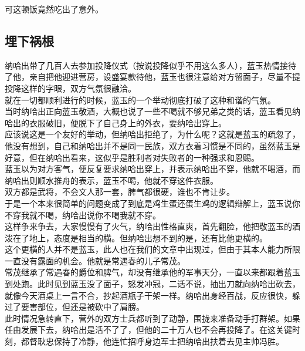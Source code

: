 \begin{multicols}{\theparacolNo}
可这顿饭竟然吃出了意外。\\

\subsection{埋下祸根}
纳哈出带了几百人去参加投降仪式（按说投降似乎不用这么多人），蓝玉热情接待了他，亲自把他迎进营房，设盛宴款待他，蓝玉也很注意给对方留面子，尽量不提投降这样的字眼，双方气氛很融洽。\\

就在一切都顺利进行的时候，蓝玉的一个举动彻底打破了这种和谐的气氛。\\

当时纳哈出正向蓝玉敬酒，大概也说了一些不喝就不够兄弟之类的话，蓝玉看见纳哈出的衣服破旧，便脱下了自己身上的外衣，要纳哈出穿上。\\

应该说这是一个友好的举动，但纳哈出拒绝了，为什么呢？这就是蓝玉的疏忽了，他没有想到，自己和纳哈出并不是同一民族，双方衣着习惯是不同的，虽然蓝玉是好意，但在纳哈出看来，这似乎是胜利者对失败者的一种强求和恩赐。\\

蓝玉以为对方客气，便反复要求纳哈出穿上，并表示纳哈出不穿，他就不喝酒，而纳哈出则顺水推舟的表示，蓝玉不喝，他就不穿这件衣服。\\

双方都是武将，不会文人那一套，脾气都很硬，谁也不肯让步。\\

于是一个本来很简单的问题变成了到底是鸡生蛋还蛋生鸡的逻辑辩解上，蓝玉说你不穿我就不喝，纳哈出说你不喝我就不穿。\\

这样争来争去，大家慢慢有了火气，纳哈出性格直爽，首先翻脸，他把敬蓝玉的酒泼在了地上，态度是相当的横。但纳哈出想不到的是，还有比他更横的。\\

这个更横的人并不是蓝玉，此人也在我们的文章中出现过，但由于其本人能力所限一直没有露面的机会。他就是常遇春的儿子常茂。\\

常茂继承了常遇春的爵位和脾气，却没有继承他的军事天分，一直以来都跟着蓝玉到处跑。此时见到蓝玉没了面子，怒发冲冠，二话不说，抽出刀就向纳哈出砍去，就像今天酒桌上一言不合，抄起酒瓶子干架一样。纳哈出身经百战，反应很快，躲过了要害部位，但还是被砍中了肩膀。\\

此时情况急转直下，营外的双方士兵都听到了动静，围拢来准备动手打群架。如果任由发展下去，纳哈出是活不了了，但他的二十万人也不会再投降了。在这关键时刻，都督耿忠保持了冷静，他连忙招呼身边军士把纳哈出扶着去见主帅冯胜。\\


\end{multicols}
